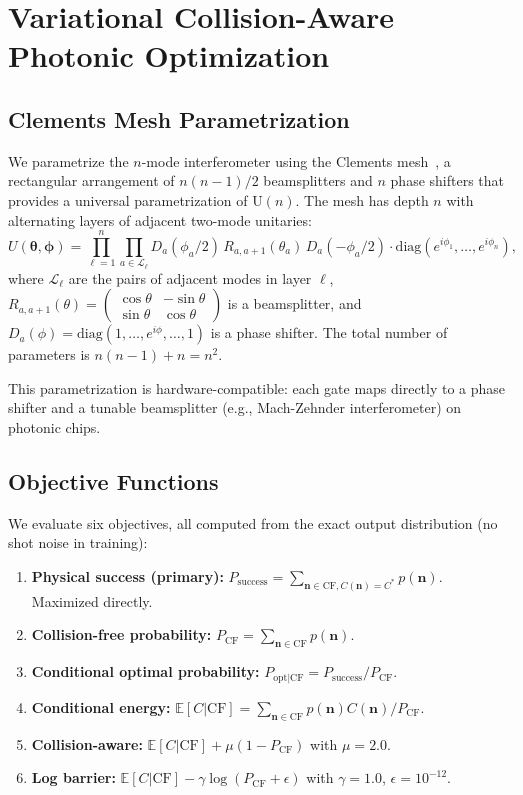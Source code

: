 \section{Variational Collision-Aware Photonic Optimization}
\label{sec:methods}

\subsection{Clements Mesh Parametrization}

We parametrize the $n$-mode interferometer using the Clements mesh~\cite{clements2016optimal}, a rectangular arrangement of $n(n-1)/2$ beamsplitters and $n$ phase shifters that provides a universal parametrization of $\mathrm{U}(n)$. The mesh has depth $n$ with alternating layers of adjacent two-mode unitaries:
\begin{equation}
U(\boldsymbol{\theta}, \boldsymbol{\phi}) = \prod_{\ell=1}^{n} \prod_{a \in \mathcal{L}_\ell} D_a(\phi_a/2) \, R_{a,a+1}(\theta_a) \, D_a(-\phi_a/2) \cdot \mathrm{diag}(e^{i\phi_1},\dots,e^{i\phi_n}),
\end{equation}
where $\mathcal{L}_\ell$ are the pairs of adjacent modes in layer $\ell$, $R_{a,a+1}(\theta) = \begin{pmatrix} \cos\theta & -\sin\theta \\ \sin\theta & \cos\theta \end{pmatrix}$ is a beamsplitter, and $D_a(\phi) = \mathrm{diag}(1,\dots,e^{i\phi},\dots,1)$ is a phase shifter. The total number of parameters is $n(n-1) + n = n^2$.

This parametrization is hardware-compatible: each gate maps directly to a phase shifter and a tunable beamsplitter (e.g., Mach-Zehnder interferometer) on photonic chips.

\subsection{Objective Functions}

We evaluate six objectives, all computed from the exact output distribution (no shot noise in training):

\begin{enumerate}
\item \textbf{Physical success (primary):} $P_{\mathrm{success}} = \sum_{\mathbf{n}\in\mathrm{CF}, C(\mathbf{n})=C^*} p(\mathbf{n})$. Maximized directly.
\item \textbf{Collision-free probability:} $P_{\mathrm{CF}} = \sum_{\mathbf{n}\in\mathrm{CF}} p(\mathbf{n})$.
\item \textbf{Conditional optimal probability:} $P_{\mathrm{opt|CF}} = P_{\mathrm{success}} / P_{\mathrm{CF}}$.
\item \textbf{Conditional energy:} $\mathbb{E}[C|\mathrm{CF}] = \sum_{\mathbf{n}\in\mathrm{CF}} p(\mathbf{n}) C(\mathbf{n}) / P_{\mathrm{CF}}$.
\item \textbf{Collision-aware:} $\mathbb{E}[C|\mathrm{CF}] + \mu(1-P_{\mathrm{CF}})$ with $\mu=2.0$.
\item \textbf{Log barrier:} $\mathbb{E}[C|\mathrm{CF}] - \gamma \log(P_{\mathrm{CF}}+\epsilon)$ with $\gamma=1.0$, $\epsilon=10^{-12}$.
\end{enumerate}

